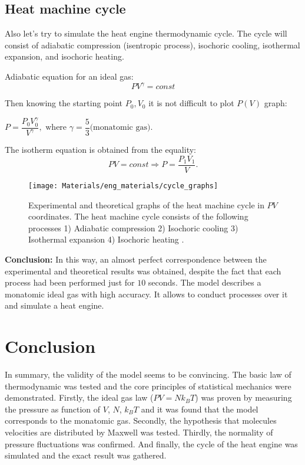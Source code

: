 \documentclass[12pt,twoside]{article}
\begin{document}
    \subsection{Heat machine cycle}
    Also let's try to simulate the heat engine thermodynamic cycle\cite{wiki:heatmachine}.
    The cycle will consist of adiabatic compression (isentropic process), isochoric cooling, isothermal expansion, and isochoric heating.

    Adiabatic equation for an ideal gas:
    \begin{equation}
        PV^\gamma = const
    \end{equation}

    Then knowing the starting point $P_0, V_0$ it is not difficult to plot $P(V)$ graph:
    
    $P = \dfrac{P_0 V_0^\gamma}{V ^\gamma}, \text{ where } \gamma = \dfrac{5}{3} \text{(monatomic gas)}.    $
    
    The isotherm equation is obtained from the equality:
    \begin{equation}
        PV = const \Rightarrow P = \dfrac{P_1 V_1}{V}.
    \end{equation}

    \begin{figure}[H]
        \centering
        {\texttt{[image: Materials/eng\_materials/cycle\_graphs]}}
        \caption{Experimental and theoretical graphs of the heat machine cycle in $PV$ coordinates. 
        The heat machine cycle consists of the following processes
        1) Adiabatic compression 2) Isochoric cooling 3) Isothermal expansion 4) Isochoric heating .}
    \end{figure}

    \textbf{Conclusion:}
    In this way, an almost perfect correspondence between the experimental and theoretical results was obtained, despite the fact that
    each process had been performed just for $10$ seconds.
    The model describes a monatomic ideal gas with high accuracy. It allows to conduct processes over it and simulate a heat engine.

    \section{Conclusion}
    
    \indent In summary, the validity of the model seems to be convincing. 
    The basic law of thermodynamic was tested and the core principles of statistical mechanics were demonstrated.
    Firstly, the ideal gas law ($P V = N k_B T$) was proven by measuring the pressure as function of $V$, $N$, $k_B T$ and it was found that the model corresponds to the monatomic gas.
    Secondly, the hypothesis that molecules velocities are distributed by Maxwell was tested.
    Thirdly, the normality of pressure fluctuations was confirmed.
    And finally, the cycle of the heat engine was simulated and the exact result was gathered.
    
    
\end{document}
